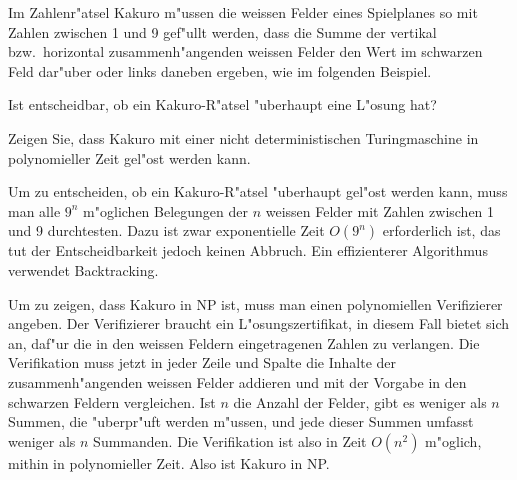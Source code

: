 Im Zahlenr"atsel Kakuro m"ussen die weissen Felder eines Spielplanes
so mit Zahlen zwischen 1 und 9 gef"ullt werden, dass die Summe der
vertikal bzw.~horizontal zusammenh"angenden weissen Felder den Wert im
schwarzen Feld dar"uber oder links daneben ergeben, wie im folgenden
Beispiel. 
\begin{center}
\end{center}
\begin{teilaufgaben}
\item 
Ist entscheidbar, ob ein Kakuro-R"atsel "uberhaupt eine L"osung
hat?
\item
Zeigen Sie, dass Kakuro mit einer nicht deterministischen Turingmaschine
in polynomieller Zeit gel"ost werden kann.
\end{teilaufgaben}

\begin{loesung}
\begin{teilaufgaben}
\item
Um zu entscheiden, ob ein Kakuro-R"atsel "uberhaupt gel"ost werden
kann, muss man alle $9^n$ m"oglichen Belegungen der $n$ weissen
Felder mit Zahlen zwischen 1 und 9 durchtesten. Dazu ist zwar
exponentielle Zeit $O(9^n)$ erforderlich ist, das tut der Entscheidbarkeit
jedoch keinen Abbruch.
Ein effizienterer Algorithmus verwendet Backtracking.
\item
Um zu zeigen, dass Kakuro in NP ist, muss man einen polynomiellen
Verifizierer angeben. Der Verifizierer braucht ein L"osungszertifikat,
in diesem Fall bietet sich an, daf"ur die in den weissen Feldern eingetragenen
Zahlen zu verlangen. Die Verifikation muss jetzt in jeder Zeile und
Spalte die Inhalte der zusammenh"angenden weissen Felder addieren und 
mit der Vorgabe in den schwarzen Feldern vergleichen. Ist $n$ die Anzahl
der Felder, gibt es weniger als $n$ Summen, die "uberpr"uft werden m"ussen,
und jede dieser Summen umfasst weniger als $n$ Summanden. Die Verifikation
ist also in Zeit $O(n^2)$ m"oglich, mithin in polynomieller Zeit.
Also ist Kakuro in NP.
\end{teilaufgaben}
\end{loesung}
